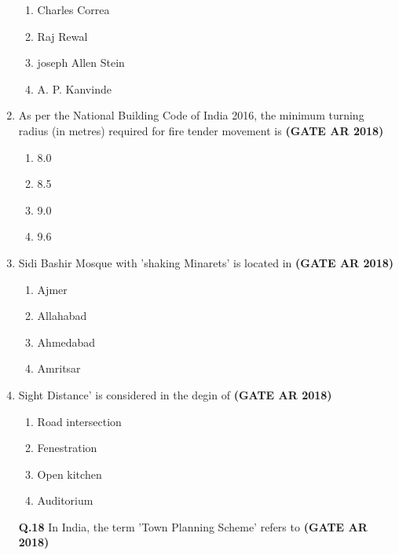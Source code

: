 \documentclass[journal,15pt,onecolumn]{IEEEtran}
\theoremstyle{remark}
\begin{document}
\begin{enumerate}
\begin{enumerate}

    \item  Charles Correa
    \item  Raj Rewal 
    \item joseph Allen Stein
    \item  A. P. Kanvinde
\end{enumerate}
\vspace{0.6cm}

\item 
As per the National Building Code of India 2016, the minimum turning radius (in metres) required for fire tender movement is \hfill \textbf{ (GATE AR 2018)}


\begin{enumerate}
     \item   8.0 
     \item    8.5 
     \item   9.0 
     \item  9.6
     \end{enumerate}


 
\item 
Sidi Bashir Mosque with 'shaking Minarets' is located in\hfill \textbf{ (GATE AR 2018)}

\begin{enumerate}

\item   Ajmer 
\item  Allahabad 
\item   Ahmedabad
\item  Amritsar 
\end{enumerate}

\item 
Sight Distance' is considered in the degin of \hfill \textbf{ (GATE AR 2018)}


    
\begin{enumerate}
\item  Road intersection 
\item   Fenestration 
\item  Open kitchen 
\item   Auditorium 
\end{enumerate}

\vspace{0.5cm}

\textbf{Q.18} \hspace{0.3cm} In India, the term 'Town Planning Scheme' refers to\hfill \textbf{ (GATE AR 2018)}


\end{enumerate}
\end{document}
